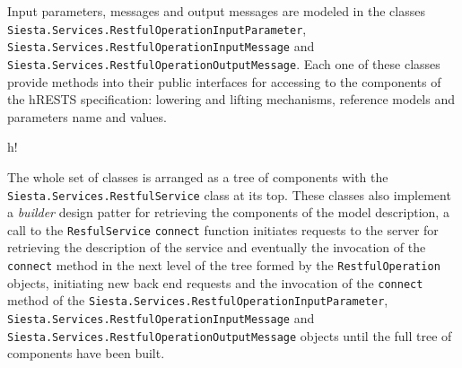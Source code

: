 Input parameters, messages and output messages are modeled in the classes
\texttt{Siesta.Services.RestfulOperationInputParameter}, \texttt{Siesta.Services.RestfulOperationInputMessage} and
\texttt{Siesta.Services.RestfulOperationOutputMessage}. Each one of these classes provide methods into their public
interfaces for accessing to the components of the hRESTS specification: lowering and lifting mechanisms, reference models
and parameters name and values.\\

\begin{table}{h!}
\noindent{}
\caption{Components in the service layer of the Siesta Framework}
\end{table}

The whole set of classes is arranged as a tree of components with the \texttt{Siesta.Services.RestfulService} class at
its top. These classes also implement a {\it builder} design patter for retrieving the components of the model
description, a call to the \texttt{ResfulService} \texttt{connect} function initiates requests to the server for
retrieving the description of the service and eventually the invocation of the \texttt{connect} method in the next level
of the tree formed by the \texttt{RestfulOperation} objects, initiating new back end requests and the invocation of the 
\texttt{connect} method of the \texttt{Siesta.Services.RestfulOperationInputParameter}, \texttt{Siesta.Services.RestfulOperationInputMessage} and
\texttt{Siesta.Services.RestfulOperationOutputMessage} objects until the full tree of components have been built.

